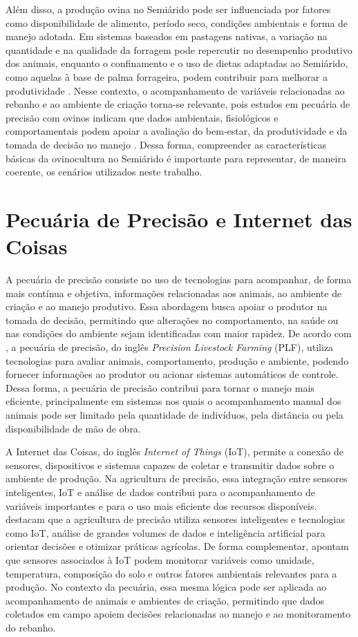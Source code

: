 Além disso, a produção ovina no Semiárido pode ser influenciada por fatores como disponibilidade de alimento, período seco, condições ambientais e forma de manejo adotada. Em sistemas baseados em pastagens nativas, a variação na quantidade e na qualidade da forragem pode repercutir no desempenho produtivo dos animais, enquanto o confinamento e o uso de dietas adaptadas ao Semiárido, como aquelas à base de palma forrageira, podem contribuir para melhorar a produtividade \cite{cartaxo2025}. Nesse contexto, o acompanhamento de variáveis relacionadas ao rebanho e ao ambiente de criação torna-se relevante, pois estudos em pecuária de precisão com ovinos indicam que dados ambientais, fisiológicos e comportamentais podem apoiar a avaliação do bem-estar, da produtividade e da tomada de decisão no manejo \cite{nikolopoulou2026}. Dessa forma, compreender as características básicas da ovinocultura no Semiárido é importante para representar, de maneira coerente, os cenários utilizados neste trabalho.

\section{Pecuária de Precisão e Internet das Coisas}
\label{sec:pecuaria-precisao-iot}

A pecuária de precisão consiste no uso de tecnologias para acompanhar, de forma mais contínua e objetiva, informações relacionadas aos animais, ao ambiente de criação e ao manejo produtivo. Essa abordagem busca apoiar o produtor na tomada de decisão, permitindo que alterações no comportamento, na saúde ou nas condições do ambiente sejam identificadas com maior rapidez. De acordo com , a pecuária de precisão, do inglês \textit{Precision Livestock Farming} (PLF), utiliza tecnologias para avaliar animais, comportamento, produção e ambiente, podendo fornecer informações ao produtor ou acionar sistemas automáticos de controle. Dessa forma, a pecuária de precisão contribui para tornar o manejo mais eficiente, principalmente em sistemas nos quais o acompanhamento manual dos animais pode ser limitado pela quantidade de indivíduos, pela distância ou pela disponibilidade de mão de obra.

A Internet das Coisas, do inglês \textit{Internet of Things} (IoT), permite a conexão de sensores, dispositivos e sistemas capazes de coletar e transmitir dados sobre o ambiente de produção. Na agricultura de precisão, essa integração entre sensores inteligentes, IoT e análise de dados contribui para o acompanhamento de variáveis importantes e para o uso mais eficiente dos recursos disponíveis.  destacam que a agricultura de precisão utiliza sensores inteligentes e tecnologias como IoT, análise de grandes volumes de dados e inteligência artificial para orientar decisões e otimizar práticas agrícolas. De forma complementar,  apontam que sensores associados à IoT podem monitorar variáveis como umidade, temperatura, composição do solo e outros fatores ambientais relevantes para a produção. No contexto da pecuária, essa mesma lógica pode ser aplicada ao acompanhamento de animais e ambientes de criação, permitindo que dados coletados em campo apoiem decisões relacionadas ao manejo e ao monitoramento do rebanho.

